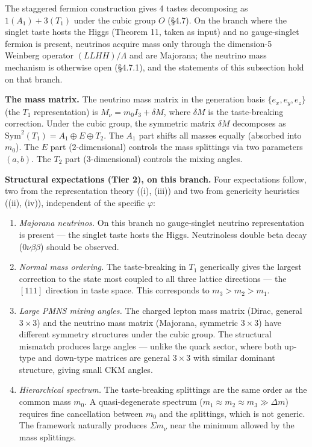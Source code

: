 \documentclass[
]{article}
\begin{document}
The staggered fermion construction gives 4 tastes decomposing as
\(1(A_1) + 3(T_1)\) under the cubic group \(O\) (§4.7). On the branch
where the singlet taste hosts the Higgs (Theorem 11, taken as input) and
no gauge-singlet fermion is present, neutrinos acquire mass only through
the dimension-5 Weinberg operator \((LLHH)/\Lambda\) and are Majorana;
the neutrino mass mechanism is otherwise open (§4.7.1), and the
statements of this subsection hold on that branch.

\textbf{The mass matrix.} The neutrino mass matrix in the generation
basis \(\{e_x, e_y, e_z\}\) (the \(T_1\) representation) is
\(M_\nu = m_0 I_3 + \delta M\), where \(\delta M\) is the taste-breaking
correction. Under the cubic group, the symmetric matrix \(\delta M\)
decomposes as \(\mathrm{Sym}^2(T_1) = A_1 \oplus E \oplus T_2\). The
\(A_1\) part shifts all masses equally (absorbed into \(m_0\)). The
\(E\) part (2-dimensional) controls the mass splittings via two
parameters \((a, b)\). The \(T_2\) part (3-dimensional) controls the
mixing angles.

\textbf{Structural expectations (Tier 2), on this branch.} Four
expectations follow, two from the representation theory ((i), (iii)) and
two from genericity heuristics ((ii), (iv)), independent of the specific
\(\varphi\):

\begin{enumerate}
\def\labelenumi{(\roman{enumi})}
\item
  \emph{Majorana neutrinos.} On this branch no gauge-singlet neutrino
  representation is present --- the singlet taste hosts the Higgs.
  Neutrinoless double beta decay (\(0\nu\beta\beta\)) should be
  observed.
\item
  \emph{Normal mass ordering.} The taste-breaking in \(T_1\) generically
  gives the largest correction to the state most coupled to all three
  lattice directions --- the \([111]\) direction in taste space. This
  corresponds to \(m_3 > m_2 > m_1\).
\item
  \emph{Large PMNS mixing angles.} The charged lepton mass matrix
  (Dirac, general \(3 \times 3\)) and the neutrino mass matrix
  (Majorana, symmetric \(3 \times 3\)) have different symmetry
  structures under the cubic group. The structural mismatch produces
  large angles --- unlike the quark sector, where both up-type and
  down-type matrices are general \(3 \times 3\) with similar dominant
  structure, giving small CKM angles.
\item
  \emph{Hierarchical spectrum.} The taste-breaking splittings are the
  same order as the common mass \(m_0\). A quasi-degenerate spectrum
  (\(m_1 \approx m_2 \approx m_3 \gg \Delta m\)) requires fine
  cancellation between \(m_0\) and the splittings, which is not generic.
  The framework naturally produces \(\Sigma m_\nu\) near the minimum
  allowed by the mass splittings.
\end{enumerate}
\end{document}
